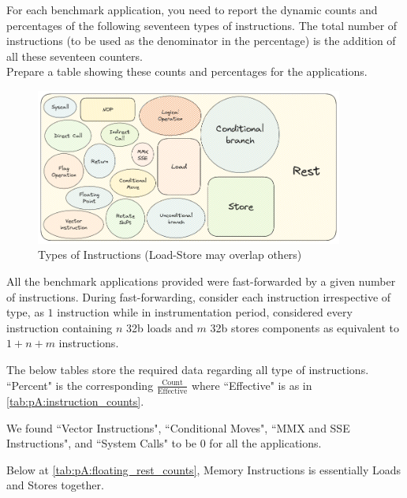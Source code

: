 \begin{Problem}
For each benchmark application, you need to report the dynamic counts and percentages of the following seventeen types of instructions. The total number of instructions (to be used as the denominator in the percentage) is the addition of all these seventeen counters. \\


Prepare a table showing these counts and percentages for the applications.
\end{Problem}

\begin{Solution}

\begin{figure}[H]
    \centering
    \includegraphics[width=0.9\textwidth]{images/CS422_QuestionA.png}
    \caption{Types of Instructions (Load-Store may overlap others)}
    \label{fig:pA:partitions}
\end{figure}

All the benchmark applications provided were fast-forwarded by a given number of instructions. During fast-forwarding, consider each instruction irrespective of type, as $1$ instruction while in instrumentation period, considered every instruction containing $n$ 32b loads and $m$ 32b stores components as equivalent to $1 + n + m$ instructions.

\vspace{10pt}
The below tables store the required data regarding all type of instructions. ``Percent" is the corresponding $\frac{\text{Count}}{\text{Effective}}$ where ``Effective" is as in \ref{tab:pA:instruction_counts}.

We found ``Vector Instructions", ``Conditional Moves", ``MMX and SSE Instructions", and ``System Calls" to be $0$ for all the applications.

Below at \ref{tab:pA:floating_rest_counts}, Memory Instructions is essentially Loads and Stores together.


\end{Solution}
